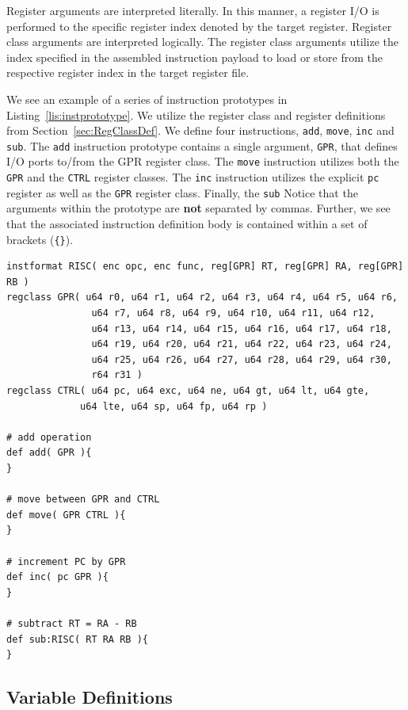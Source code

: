 \documentclass{article}
\begin{document}
Register arguments are interpreted literally.  In this manner, a register I/O is performed to the specific 
register index denoted by the target register.  Register class arguments are interpreted logically.  The register 
class arguments utilize the index specified in the assembled instruction payload to load or store from the respective 
register index in the target register file.  

We see an example of a series of instruction prototypes in Listing~\ref{lis:instprototype}.  We utilize the register class 
and register definitions from Section~\ref{sec:RegClassDef}.  We define four instructions, \texttt{add}, \texttt{move}, 
\texttt{inc} and \texttt{sub}.  The \texttt{add} instruction prototype contains a single argument, \texttt{GPR}, that defines I/O ports 
to/from the GPR register class.  The \texttt{move} instruction utilizes both the \texttt{GPR} and the \texttt{CTRL} 
register classes.  The \texttt{inc} instruction utilizes the explicit \texttt{pc} register as well as the \texttt{GPR} 
register class.  Finally, the \texttt{sub} Notice that the arguments within the prototype are \textbf{not} separated by commas.  Further, we see 
that the associated instruction definition body is contained within a set of brackets (\texttt{\{\}}).  

\clearpage
\vspace{0.125in}
\begin{lstlisting}[frame=single,style=base,caption={Instruction Prototype Format},captionpos=b,label={lis:instprototype}]
instformat RISC( enc opc, enc func, reg[GPR] RT, reg[GPR] RA, reg[GPR] RB )
regclass GPR( u64 r0, u64 r1, u64 r2, u64 r3, u64 r4, u64 r5, u64 r6, 
		       u64 r7, u64 r8, u64 r9, u64 r10, u64 r11, u64 r12, 
		       u64 r13, u64 r14, u64 r15, u64 r16, u64 r17, u64 r18,
		       u64 r19, u64 r20, u64 r21, u64 r22, u64 r23, u64 r24, 
		       u64 r25, u64 r26, u64 r27, u64 r28, u64 r29, u64 r30,
		       r64 r31 )
regclass CTRL( u64 pc, u64 exc, u64 ne, u64 gt, u64 lt, u64 gte,
			 u64 lte, u64 sp, u64 fp, u64 rp )

# add operation			 
def add( GPR ){
}

# move between GPR and CTRL 
def move( GPR CTRL ){
}

# increment PC by GPR
def inc( pc GPR ){
}

# subtract RT = RA - RB
def sub:RISC( RT RA RB ){
}
\end{lstlisting}

\clearpage
\subsection{Variable Definitions}
\label{sec:Variable Definitions}
\end{document}
